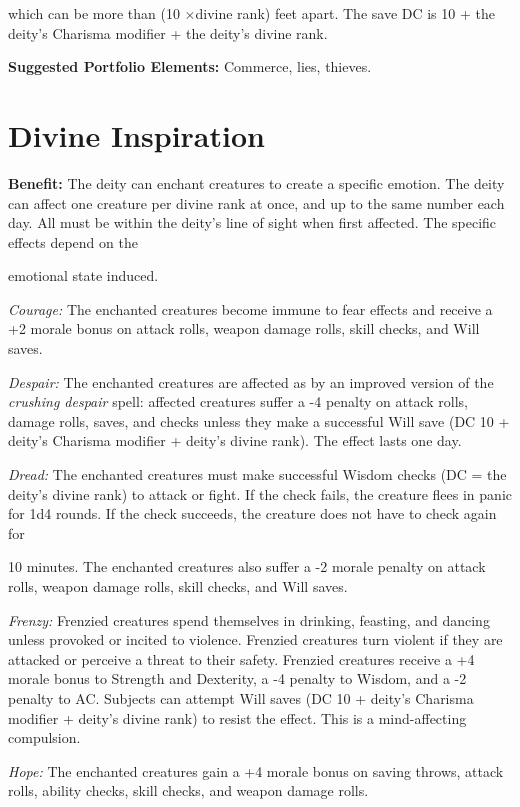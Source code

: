 \documentclass{article}
\begin{document}
which can be more than (10 \ensuremath{\times}divine rank) feet apart. The save 
DC is 10 + the deity's Charisma modifier + the deity's divine rank.

\textbf{Suggested Portfolio Elements:} Commerce, lies, thieves.

\vspace{12pt}
\section*{Divine Inspiration}

\textbf{Benefit:} The deity can enchant creatures to create a specific emotion. 
The deity can affect one creature per divine rank at once, and up to the same number 
each day. All must be within the deity's line of sight when first affected. The 
specific effects depend on the

emotional state induced.

\textit{Courage: }The enchanted creatures become immune to fear effects and receive 
a +2 morale bonus on attack rolls, weapon damage rolls, skill checks, and Will 
saves.

\textit{Despair: }The enchanted creatures are affected as by an improved version 
of the \textit{crushing despair} spell: affected creatures suffer a -4 penalty 
on attack rolls, damage rolls, saves, and checks\textit{ }unless they make a successful 
Will save (DC 10 + deity's Charisma modifier + deity's divine rank). The effect 
lasts one day.

\textit{Dread: }The enchanted creatures must make successful Wisdom checks (DC 
= the deity's divine rank) to attack or fight. If the check fails, the creature 
flees in panic for 1d4 rounds. If the check succeeds, the creature does not have 
to check again for

10 minutes. The enchanted creatures also suffer a -2 morale penalty on attack rolls, 
weapon damage rolls, skill checks, and Will saves.

\textit{Frenzy: }Frenzied creatures spend themselves in drinking, feasting, and 
dancing unless provoked or incited to violence. Frenzied creatures turn violent 
if they are attacked or perceive a threat to their safety. Frenzied creatures receive 
a +4 morale bonus to Strength and Dexterity, a -4 penalty to Wisdom, and a -2 penalty 
to AC. Subjects can attempt Will saves (DC 10 + deity's Charisma modifier + deity's 
divine rank) to resist the effect. This is a mind-affecting compulsion.

\textit{Hope: }The enchanted creatures gain a +4 morale bonus on saving throws, 
attack rolls, ability checks, skill checks, and weapon damage rolls.
\end{document}

